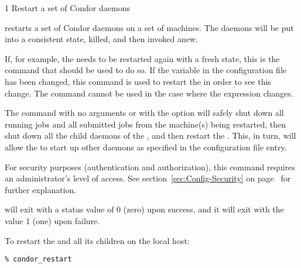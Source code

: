\begin{ManPage}{\label{man-condor-restart}}{1}
{Restart a set of Condor daemons}
\Synopsis {}
\ToolArgsBase

\ToolDebugOption
\ToolWhere
\ToolArgsAffect


\Description 

 restarts a set of Condor daemons on a set
of machines.
The daemons will be put into a consistent state,
killed, and then invoked anew.

If, for example, the  needs to be restarted again with
a fresh state, this is the command that should be used to do so.
If the  variable in the configuration file has
been changed, this command is used to restart the 
in order to see this change.
The  command cannot be used in the case where the
 expression changes.

The command
 with no arguments or with the 
 option
will safely shut down all running jobs and all submitted
jobs from the machine(s) being restarted, then shut down
all the child daemons of the ,
and then restart the .
This, in turn, will allow the  to start up
other daemons as specified in the  configuration
file entry.

For security purposes (authentication and authorization),
this command requires an administrator's level of access.
See
section~\ref{sec:Config-Security} on page~\pageref{sec:Config-Security}
for further explanation.

\begin{Options}
	\ToolArgsDesc
	\ToolDebugDesc
\end{Options}

\ExitStatus

 will exit with a status value of 0 (zero) upon success,
and it will exit with the value 1 (one) upon failure.

\Examples
To restart the  and all its children
on the local host:
\begin{verbatim}
% condor_restart
\end{verbatim}


\end{ManPage}
